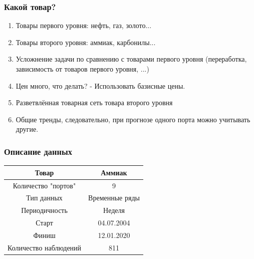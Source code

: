 \begin{frame}
\titlepage 
\end{frame}

\begin{frame}
\frametitle{Какой товар?}
\begin{enumerate}[\Sun]
	\item Товары первого уровня: нефть, газ, золото...
	
	\item Товары второго уровня: аммиак, карбонилы...
	
	\item Усложнение задачи по сравнению с товарами первого уровня (переработка, зависимость от товаров первого уровня, ...)
	
	\item Цен много, что делать? - Использовать базисные цены.
	
	\item Разветвлённая товарная сеть товара второго уровня
	
	\item Общие тренды, следовательно, при прогнозе одного порта можно учитывать другие.
\end{enumerate}
\end{frame}

\begin{frame}
\frametitle{Описание данных}
\begin{table}[]
	\begin{tabular}{|c|c|}
		\hline
		Товар                 & Аммиак         \\ \hline
		Количество "портов"   & 9              \\ \hline
		Тип данных            & Временные ряды \\ \hline
		Периодичность         & Неделя         \\ \hline
		Старт                 & 04.07.2004     \\ \hline
		Финиш                 & 12.01.2020     \\ \hline
		Количество наблюдений & 811            \\ \hline
	\end{tabular}
\end{table}

\end{frame}



